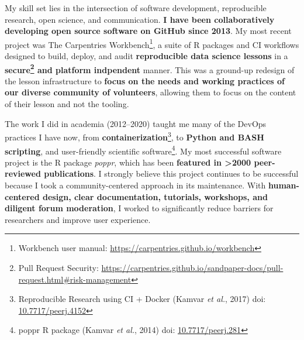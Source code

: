 \vspace{2ex}

My skill set lies in the intersection of software development, reproducible research, open science, and communication. 
\textbf{I have been collaboratively developing open source software on GitHub since 2013}.
My most recent project was The Carpentries Workbench\footnote{Workbench user manual: \url{https://carpentries.github.io/workbench}}, 
a suite of R packages and CI workflows designed to build, deploy, and audit \textbf{reproducible
data science lessons} in a \textbf{secure\footnote{Pull Request Security: \url{https://carpentries.github.io/sandpaper-docs/pull-request.html\#risk-management}} and platform indpendent} manner.
This was a ground-up redesign of the lesson infrastructure to \textbf{focus on
the needs and working practices of our diverse community of volunteers},
allowing them to focus on the content of their lesson and not the tooling.

\vspace{2ex}

The work I did in academia (2012--2020) taught me many of the DevOps practices I have now, from \textbf{containerization}\footnote{Reproducible Research using CI + Docker (Kamvar \textit{et al.}, 2017) doi: \href{https://doi.org/10.7717/peerj.4152}{10.7717/peerj.4152}}, to \textbf{Python and BASH scripting}, 
and user-friendly scientific software\footnote{poppr R package (Kamvar \textit{et al.}, 2014) doi: \href{https://doi.org/10.7717/peerj.281}{10.7717/peerj.281}}.
My most successful software project is the R package
\textit{poppr}, which has been \textbf{featured in \textgreater2000
peer-reviewed publications}. I strongly believe this project
continues to be successful because I took a community-centered approach in its
maintenance. With \textbf{human-centered design, clear documentation, tutorials,
workshops, and diligent forum moderation}, I worked to significantly
reduce barriers for researchers and improve user experience.


